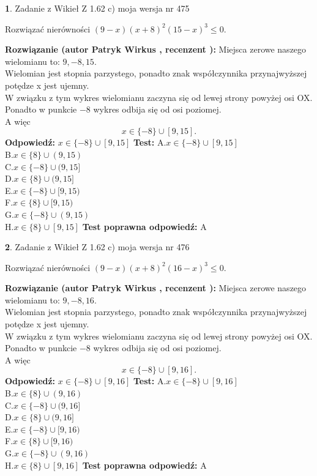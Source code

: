 \documentclass[12pt, a4paper]{article}
\theoremstyle{definition} %
\newtheorem{zad}{}
\newcommand{\zadStart}[1]{\begin{zad}#1\newline}
\newcommand{\zadStop}{\end{zad}}
\newcommand{\rozwStart}[2]{\noindent \textbf{Rozwiązanie (autor #1 , recenzent #2): }\newline}
\newcommand{\rozwStop}{\newline}
\newcommand{\odpStart}{\noindent \textbf{Odpowiedź:}\newline}
\newcommand{\odpStop}{\newline}
\newcommand{\testStart}{\noindent \textbf{Test:}\newline}
\newcommand{\testStop}{\newline}
\newcommand{\kluczStart}{\noindent \textbf{Test poprawna odpowiedź:}\newline}
\newcommand{\kluczStop}{\newline}
\begin{document}
\zadStart{Zadanie z Wikieł Z 1.62 c) moja wersja nr 475}

Rozwiązać nierówności $(9-x)(x+8)^{2}(15-x)^{3}\le0$.
\zadStop
\rozwStart{Patryk Wirkus}{}
Miejsca zerowe naszego wielomianu to: $9, -8, 15$.\\
Wielomian jest stopnia parzystego, ponadto znak współczynnika przy\linebreak najwyższej potędze x jest ujemny.\\ W związku z tym wykres wielomianu zaczyna się od lewej strony powyżej osi OX.\\
Ponadto w punkcie $-8$ wykres odbija się od osi poziomej.\\
A więc $$x \in \{-8\} \cup [9,15].$$
\rozwStop
\odpStart
$x \in \{-8\} \cup [9,15]$
\odpStop
\testStart
A.$x \in \{-8\} \cup [9,15]$\\
B.$x \in \{8\} \cup (9,15)$\\
C.$x \in \{-8\} \cup (9,15]$\\
D.$x \in \{8\} \cup (9,15]$\\
E.$x \in \{-8\} \cup [9,15)$\\
F.$x \in \{8\} \cup [9,15)$\\
G.$x \in \{-8\} \cup (9,15)$\\
H.$x \in \{8\} \cup [9,15]$
\testStop
\kluczStart
A
\kluczStop



\zadStart{Zadanie z Wikieł Z 1.62 c) moja wersja nr 476}

Rozwiązać nierówności $(9-x)(x+8)^{2}(16-x)^{3}\le0$.
\zadStop
\rozwStart{Patryk Wirkus}{}
Miejsca zerowe naszego wielomianu to: $9, -8, 16$.\\
Wielomian jest stopnia parzystego, ponadto znak współczynnika przy\linebreak najwyższej potędze x jest ujemny.\\ W związku z tym wykres wielomianu zaczyna się od lewej strony powyżej osi OX.\\
Ponadto w punkcie $-8$ wykres odbija się od osi poziomej.\\
A więc $$x \in \{-8\} \cup [9,16].$$
\rozwStop
\odpStart
$x \in \{-8\} \cup [9,16]$
\odpStop
\testStart
A.$x \in \{-8\} \cup [9,16]$\\
B.$x \in \{8\} \cup (9,16)$\\
C.$x \in \{-8\} \cup (9,16]$\\
D.$x \in \{8\} \cup (9,16]$\\
E.$x \in \{-8\} \cup [9,16)$\\
F.$x \in \{8\} \cup [9,16)$\\
G.$x \in \{-8\} \cup (9,16)$\\
H.$x \in \{8\} \cup [9,16]$
\testStop
\kluczStart
A
\kluczStop
\end{document}
